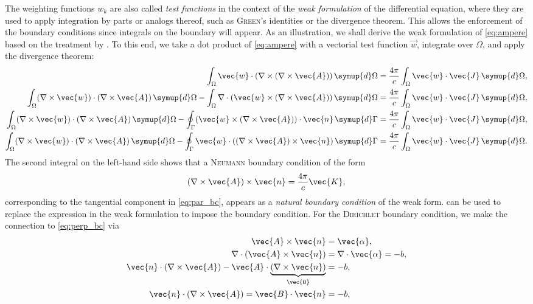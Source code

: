 The weighting functions $w_{k}$ are also called \emph{test functions} in the context of the \emph{weak formulation} of the differential equation, where they are used to apply integration by parts or analogs thereof, such as \textsc{Green}'s identities or the divergence theorem. This allows the enforcement of the boundary conditions since integrals on the boundary will appear. As an illustration, we shall derive the weak formulation of \cref{eq:ampere} based on the treatment by \textcite{Biro15}. To this end, we take a dot product of \cref{eq:ampere} with a vectorial test function $\vec{w}$, integrate over $\Omega$, and apply the divergence theorem:
\begin{align}
  \int_{\Omega} \vec{w} \cdot (\curl (\curl \vec{A})) \, \symup{d} \Omega &= \frac{4 \pi}{c} \int_{\Omega} \vec{w} \cdot \vec{J} \, \symup{d} \Omega, \notag \\
  \int_{\Omega} (\curl \vec{w}) \cdot (\curl \vec{A}) \, \symup{d} \Omega - \int_{\Omega} \nabla \cdot (\vec{w} \times (\curl \vec{A})) \, \symup{d} \Omega &= \frac{4 \pi}{c} \int_{\Omega} \vec{w} \cdot \vec{J} \, \symup{d} \Omega, \notag \\
  \int_{\Omega} (\curl \vec{w}) \cdot (\curl \vec{A}) \, \symup{d} \Omega - \oint_{\Gamma} (\vec{w} \times (\curl \vec{A})) \cdot \vec{n} \, \symup{d} \Gamma &= \frac{4 \pi}{c} \int_{\Omega} \vec{w} \cdot \vec{J} \, \symup{d} \Omega, \notag \\
  \int_{\Omega} (\curl \vec{w}) \cdot (\curl \vec{A}) \, \symup{d} \Omega - \oint_{\Gamma} \vec{w} \cdot ((\curl \vec{A}) \times \vec{n}) \, \symup{d} \Gamma &= \frac{4 \pi}{c} \int_{\Omega} \vec{w} \cdot \vec{J} \, \symup{d} \Omega. \label{eq:weak-form}
\end{align}
The second integral on the left-hand side shows that a \textsc{Neumann} boundary condition of the form
\begin{gather}
  (\curl \vec{A}) \times \vec{n} = \frac{4 \pi}{c} \vec{K}, \label{eq:natural_bc}
\end{gather}
corresponding to the tangential component in \cref{eq:par_bc}, appears as a \emph{natural boundary condition} of the weak form.  can be used to replace the expression in the weak formulation to impose the boundary condition. For the \textsc{Dirichlet} boundary condition, we make the connection to \cref{eq:perp_bc} via
\begin{align}
  \vec{A} \times \vec{n} &= \vec{\alpha}, \label{eq:essential_bc} \\
  \nabla \cdot (\vec{A} \times \vec{n}) &= \nabla \cdot \vec{\alpha} = -b, \notag \\
  \vec{n} \cdot (\curl \vec{A}) - \vec{A} \cdot \underbrace{(\curl \vec{n})}_{\vec{0}} &= -b, \notag \\
  \vec{n} \cdot (\curl \vec{A}) = \vec{B} \cdot \vec{n} &= -b, \notag
\end{align}
